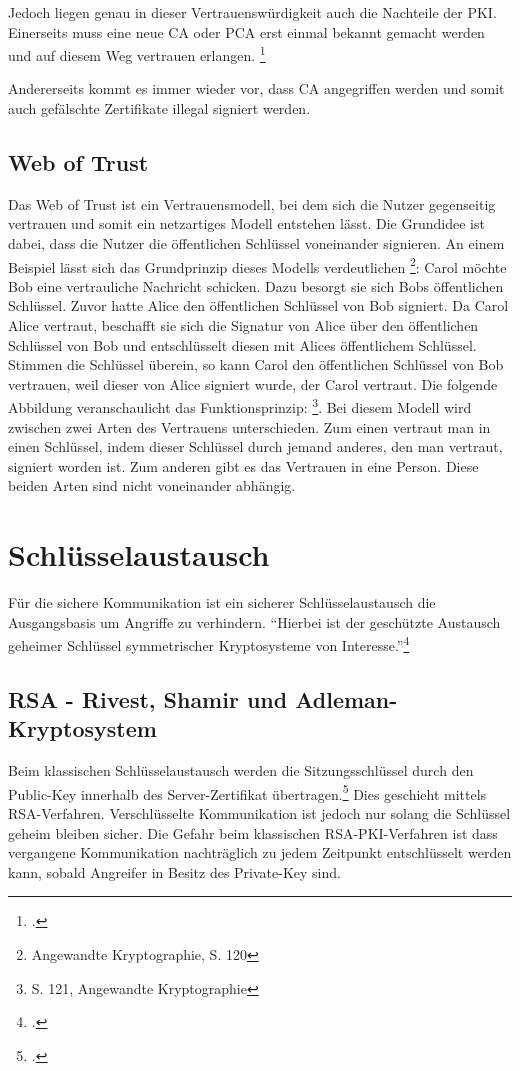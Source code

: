 \documentclass  [paper=a4,
				fontsize=12pt,
				listof=totoc,
				bibliography=totoc
				]{scrreprt}
\begin{document}
			Jedoch liegen genau in dieser Vertrauenswürdigkeit auch die Nachteile der \ac{PKI}. Einerseits muss eine neue \ac{CA} oder \ac{PCA} erst einmal bekannt gemacht werden und auf diesem Weg vertrauen erlangen. \footcite[Vgl.][]{Schwenk, S.24}
			
			Andererseits kommt es immer wieder vor, dass \ac{CA} angegriffen werden und somit auch gefälschte Zertifikate illegal signiert werden.
				
		\subsection{Web of Trust}
			Das Web of Trust ist ein Vertrauensmodell, bei dem sich die Nutzer gegenseitig vertrauen und somit ein netzartiges Modell entstehen lässt. Die Grundidee ist dabei, dass die Nutzer die öffentlichen Schlüssel voneinander signieren. An einem Beispiel lässt sich das Grundprinzip dieses Modells verdeutlichen \footnote{Angewandte Kryptographie, S. 120}: Carol möchte Bob eine vertrauliche Nachricht schicken. Dazu besorgt sie sich Bobs öffentlichen Schlüssel. Zuvor hatte Alice den öffentlichen Schlüssel von Bob signiert. Da Carol Alice vertraut, beschafft sie sich die Signatur von Alice über den öffentlichen Schlüssel von Bob und entschlüsselt diesen mit Alices öffentlichem Schlüssel. Stimmen die Schlüssel überein, so kann Carol den öffentlichen Schlüssel von Bob vertrauen, weil dieser von Alice signiert wurde, der Carol vertraut. Die folgende Abbildung veranschaulicht das Funktionsprinzip:
			\footnote{S. 121, Angewandte Kryptographie}.
			Bei diesem Modell wird zwischen zwei Arten des Vertrauens unterschieden. Zum einen vertraut man in einen Schlüssel, indem dieser Schlüssel durch jemand anderes, den man vertraut, signiert worden ist. Zum anderen gibt es das Vertrauen in eine Person. Diese beiden Arten sind nicht voneinander abhängig.

		\section{Schlüsselaustausch}
			Für die sichere Kommunikation ist ein sicherer Schlüsselaustausch die Ausgangsbasis um Angriffe zu verhindern. ``Hierbei ist der geschützte Austausch geheimer Schlüssel symmetrischer Kryptosysteme von Interesse.''\footcite[S. 437]{Eckert2013}
			\subsection{RSA - Rivest, Shamir und Adleman-Kryptosystem} 
				Beim klassischen Schlüsselaustausch werden die Sitzungsschlüssel durch den Public-Key innerhalb des Server-Zertifikat übertragen.\footcite[Vgl.][]{Boeck2013} Dies geschieht mittels \ac{RSA}-Verfahren. Verschlüsselte Kommunikation ist jedoch nur solang die Schlüssel geheim bleiben sicher. Die Gefahr beim klassischen \ac{RSA}-\ac{PKI}-Verfahren ist dass vergangene Kommunikation nachträglich zu jedem Zeitpunkt entschlüsselt werden kann, sobald Angreifer in Besitz des Private-Key sind.\medskip\\
\end{document}
